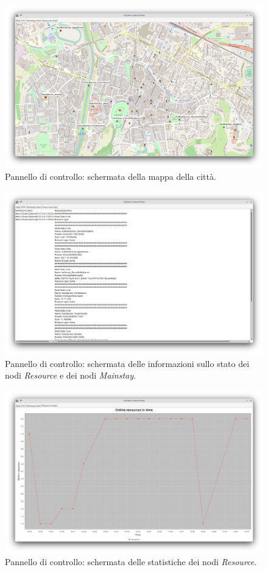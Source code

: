 \documentclass[12pt]{article}
\begin{document}
\begin{figure}[h]
    \caption{Pannello di controllo: schermata della mappa della città.}
    \includegraphics[width=\textwidth]{../assets/images/control-panel-map.png}
\end{figure}

\begin{figure}[h]
    \caption{Pannello di controllo: schermata delle informazioni sullo stato dei nodi \textit{Resource} e dei nodi \textit{Mainstay}.}
    \includegraphics[width=\textwidth]{../assets/images/control-panel-info.png}
\end{figure}

\begin{figure}[h]
    \caption{Pannello di controllo: schermata delle statistiche dei nodi \textit{Resource}.}
    \includegraphics[width=\textwidth]{../assets/images/control-panel-resources-stats.png}
\end{figure}
\end{document}
